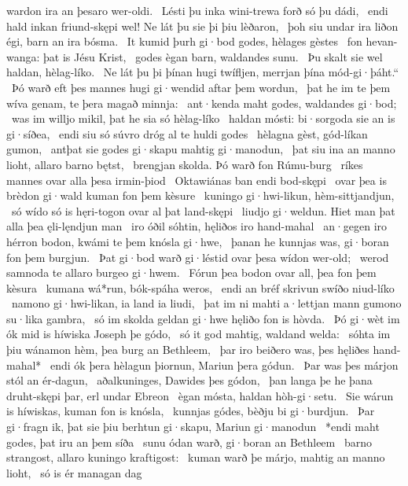 wardon ira an þesaro wer-oldi. \hld\ Lésti þu inka wini-trewa
forð só þu dádi, \hld\ endi hald inkan friund-skępi wel!
Ne lát þu sie þi þiu lèðaron, \hld\ þoh siu undar ira liðon égi,
barn an ira bósma. \hld\ It kumid þurh gi·bod godes,
hèlages gèstes \hld\ fon hevan-wanga:
þat is Jésu Krist, \hld\ godes ègan barn,
waldandes sunu. \hld\ Þu skalt sie wel haldan,
hèlag-líko. \hld\ Ne lát þu þi þínan hugi twífljen,
merrjan þína mód-gi·þáht.“ \hld\ Þó warð eft þes mannes hugi
gi·wendid aftar þem wordun, \hld\ þat he im te þem wíva genam,
te þera magað minnja: \hld\ ant·kenda maht godes,
waldandes gi·bod; \hld\ was im willjo mikil,
þat he sia só hèlag-líko \hld\ haldan mósti:
bi·sorgoda sie an is gi·síðea, \hld\ endi siu só súvro dróg
al te huldi godes \hld\ hèlagna gèst,
gód-líkan gumon, \hld\ antþat sie godes gi·skapu
mahtig gi·manodun, \hld\ þat siu ina an manno lioht,
allaro barno bętst, \hld\ brengjan skolda.
Þó warð fon Rúmu-burg \hld\ ríkes mannes%
ovar alla þesa irmin-þiod \hld\ Oktawiánas
ban endi bod-skępi \hld\ ovar þea is brèdon gi·wald
kuman fon þem kèsure \hld\ kuningo gi·hwi-likun,
hèm-sittjandjun, \hld\ só wído só is hęri-togon
ovar al þat land-skępi \hld\ liudjo gi·weldun.
Hiet man þat alla þea ęli-lęndjun man \hld\ iro óðil sóhtin,
hęliðos iro hand-mahal \hld\ an·gegen iro hérron bodon,
kwámi te þem knósla gi·hwe, \hld\ þanan he kunnjas was,
gi·boran fon þem burgjun. \hld\ Þat gi·bod warð gi·léstid
ovar þesa wídon wer-old; \hld\ werod samnoda
te allaro burgeo gi·hwem. \hld\ Fórun þea bodon ovar all,
þea fon þem kèsura \hld\ kumana wá*run,
bók-spáha weros, \hld\ endi an bréf skrivun
swíðo niud-líko \hld\ namono gi·hwi-likan,
ia land ia liudi, \hld\ þat im ni mahti a·lettjan mann
gumono su·lika gambra, \hld\ só im skolda geldan gi·hwe
hęliðo fon is hòvda. \hld\ Þó gi·wèt im ók mid is híwiska
Joseph þe gódo, \hld\ só it god mahtig,
waldand welda: \hld\ sóhta im þiu wánamon hèm,
þea burg an Bethleem, \hld\ þar iro beiðero was,
þes hęliðes hand-mahal* \hld\ endi ók þera hèlagun þiornun,
Mariun þera gódun. \hld\ Þar was þes márjon stól
an ér-dagun, \hld\ aðalkuninges,
Dawides þes gódon, \hld\ þan langa þe he þana druht-skępi þar,
erl undar Ebreon \hld\ ègan mósta,
haldan hòh-gi·setu. \hld\ Sie wárun is híwiskas,
kuman fon is knósla, \hld\ kunnjas gódes,
bèðju bi gi·burdjun. \hld\ Þar gi·fragn ik, þat sie þiu berhtun gi·skapu,
Mariun gi·manodun \hld\ *endi maht godes,
þat iru an þem síða \hld\ sunu ódan warð,
gi·boran an Bethleem \hld\ barno strangost,
allaro kuningo kraftigost: \hld\ kuman warð þe márjo,
mahtig an manno lioht, \hld\ só is ér managan dag
